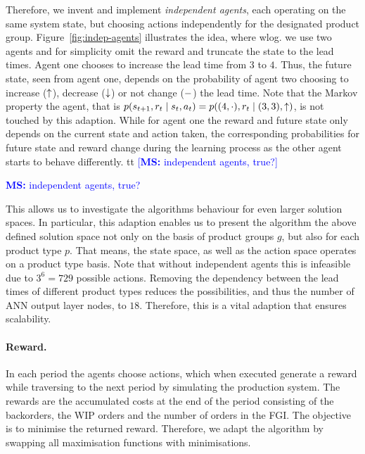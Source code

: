 \documentclass[envcountsame]{llncs}
\newcommand\MS[2][r]{\ifx t#1 \textcolor{blue}{[\textbf{MS:} #2]}
  \else \begin{center}\textcolor{blue}{\textbf{MS:} #2} \end{center} \fi}
\begin{document}
\begin{figure*}[t!]
  \centering
  \caption{Illustration of independent agents as agent one increases the lead time}\label{fig:indep-agents}
\end{figure*}
%
Therefore, we invent and implement \textit{independent agents}, each operating on the same system
state, but choosing actions independently for the designated product group.
Figure~\ref{fig:indep-agents} illustrates the idea, where wlog. we use two agents and for simplicity
omit the reward and truncate the state to the lead times. Agent one chooses to increase the lead
time from \(3\) to \(4\). Thus, the future state, seen from agent one, depends on the probability of
agent two choosing to increase (\(\uparrow\)), decrease (\(\downarrow\)) or not change (\(-\)) the lead
time. Note that the Markov property the agent, that is
\(p(s_{t+1}, r_{t} \mid s_{t}, a_{t}) = p((4,\cdot), r_{t} \mid (3,3), \uparrow) \), is not touched by
this adaption. While for agent one the reward and future state only depends on the current state and
action taken, the corresponding probabilities for future state and reward change during the learning
process as the other agent starts to behave differently.
%
\MS[t]{independent agents, true?}This allows us to investigate the algorithms behaviour for even
larger solution spaces. In particular, this adaption enables us to present the algorithm the above
defined solution space not only on the basis of product groups \(g\), but also for each product type
\(p\). That means, the state space, as well as the action space operates on a product type basis.
Note that without independent agents this is infeasible due to \(3^{6} = 729\) possible actions.
Removing the dependency between the lead times of different product types reduces the possibilities,
and thus the number of ANN output layer nodes, to \(18\). Therefore, this is a vital adaption that
ensures scalability.




\paragraph*{Reward.}
In each period the agents choose actions, which when executed generate a reward while traversing to
the next period by simulating the production system. The rewards are the accumulated costs at the
end of the period consisting of the backorders, the WIP orders and the number of orders in the
FGI\@. The objective is to minimise the returned reward. Therefore, we adapt the algorithm by
swapping all maximisation functions with minimisations.
\end{document}
